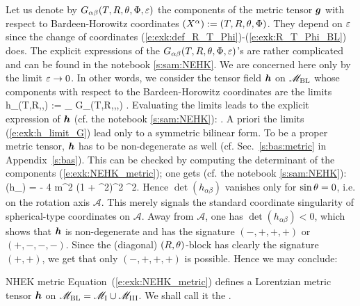 Let us denote by $G_{\alpha\beta}(T,R,\theta,\Phi,\varepsilon)$ the components of
the metric tensor $\bm{g}$ with respect to Bardeen-Horowitz
coordinates $(X^\alpha):=(T,R,\theta,\Phi)$. They depend on $\varepsilon$
since the change of coordinates (\ref{e:exk:def_R_T_Phi})-(\ref{e:exk:R_T_Phi_BL})
does. The explicit expressions of the  $G_{\alpha\beta}(T,R,\theta,\Phi,\varepsilon)$'s are
rather complicated and can be found in
the notebook \ref{s:sam:NEHK}.
We are concerned here only by the limit $\varepsilon\to 0$. In other words, we
consider the tensor field $\bm{h}$ on $\mathscr{M}_{\rm BL}$ whose components with respect to the
Bardeen-Horowitz coordinates are the limits
\be \label{e:exk:h_limit_G}
    h_{\alpha\beta}(T,R,\th,\Phi) := \lim_{\veps{}} G_{\alpha\beta}(T,R,\th,\Phi,\veps) .
\ee
Evaluating the limits leads to the explicit expression
of $\bm{h}$ (cf. the notebook \ref{s:sam:NEHK}):
\be \label{e:exk:NEHK_metric}
     .
\ee
A priori the limits (\ref{e:exk:h_limit_G}) lead only to a symmetric bilinear
form. To be a proper metric tensor, $\bm{h}$ has to be non-degenerate as well
(cf. Sec.~\ref{s:bas:metric} in Appendix~\ref{s:bas}). This can be checked by computing the
determinant of the components (\ref{e:exk:NEHK_metric}); one gets
(cf. the notebook \ref{s:sam:NEHK}):
\be
    \det (h_{\alpha\beta}) = - 4 m^2 (1 + \cos^2\th)^2 \sin^2\th .
\ee
Hence $\det (h_{\alpha\beta})$ vanishes only for $\sin\theta = 0$, i.e.
on the rotation axis $\mathscr{A}$. This merely signals the standard coordinate singularity of spherical-type coordinates on $\mathscr{A}$. Away from $\mathscr{A}$, one has $\det (h_{\alpha\beta}) < 0$, which
shows that $\bm{h}$ is non-degenerate and has the signature $(-,+,+,+)$ or $(+,-,-,-)$.
Since the (diagonal) $(R,\theta)$-block has clearly the signature $(+,+)$, we get
that only $(-,+,+,+)$ is possible. Hence we may conclude:
\begin{tprop}{NHEK metric}{}
Equation~(\ref{e:exk:NEHK_metric}) defines a Lorentzian metric tensor $\bm{h}$
on $\mathscr{M}_{\rm BL} = \mathscr{M}_{\rm I} \cup \mathscr{M}_{\rm III}$.
We shall call it the  .
\end{tprop}

